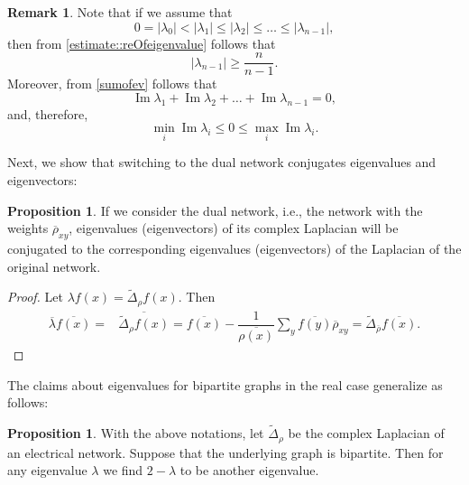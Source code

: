 \documentclass[a4paper,11pt]{amsart}
\theoremstyle{definition}
\newtheorem{remark}[theorem]{Remark}
\newtheorem{proposition}[theorem]{Proposition}
\renewcommand{\Im}{\operatorname{Im}}%
\begin{document}
\begin{remark}
Note that if we assume that 
\begin{equation*}
0=|\lambda_0|<|\lambda_1|\le|\lambda_2|\le\dots\le|\lambda_{n-1}|,
\end{equation*}
then from \eqref{estimate::reOfeigenvalue} follows that
\begin{equation*}
|\lambda_{n-1}|\ge \dfrac{n}{n-1}.
\end{equation*}
Moreover, from \eqref{sumofev} follows that
\begin{equation*}
\Im \lambda_1+\Im\lambda_2+\dots+\Im \lambda_{n-1}=0,
\end{equation*}
and, therefore,
\begin{equation*}
\min_i\Im \lambda_i\le 0\le \max_i\Im \lambda_i.
\end{equation*}
\end{remark}
Next, we show that switching to the dual network conjugates eigenvalues and eigenvectors:
\begin{proposition}
If we consider the dual network, i.e., the network with the weights $\overline \rho_{xy}$, eigenvalues (eigenvectors) of its complex Laplacian will be conjugated to the corresponding eigenvalues (eigenvectors) of the Laplacian of the original network. 
\end{proposition}
\begin{proof}
Let $\lambda f(x)=\widetilde \Delta_\rho f(x)$.
Then
\begin{align*}
\overline \lambda \overline {f(x)}=&\overline{\widetilde\Delta_\rho f(x)}=\overline{f(x)}-\dfrac{1}{\overline{\rho(x)}}\sum_{y}\overline{ f(y)}\overline\rho_{xy}=\widetilde\Delta_{\overline \rho} \overline{f(x)}.
\end{align*}
\end{proof}

The claims about eigenvalues for bipartite graphs in the real case generalize as follows:
\begin{proposition}
\label{prop:ComplexEigenvaluesBipartiteGraphs}
With the above notations, let $\widetilde \Delta_{\rho}$ be the complex Laplacian of an electrical network. Suppose that the underlying graph is bipartite. Then for any eigenvalue $\lambda$ we find $2-\lambda$ to be another eigenvalue.
\end{proposition}
\end{document}
